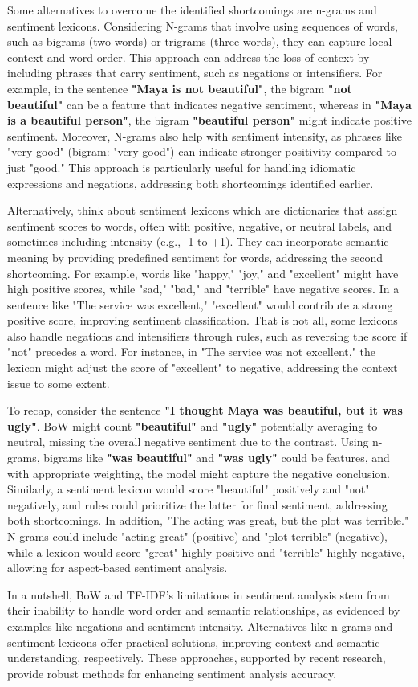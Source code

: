 Some alternatives to overcome the identified shortcomings are n-grams and sentiment lexicons. Considering N-grams that involve using sequences of words, such as bigrams (two words) or trigrams (three words), they can capture local context and word order. This approach can address the loss of context by including phrases that carry sentiment, such as negations or intensifiers. For example, in the sentence \textbf{"Maya is not beautiful"}, the bigram \textbf{"not beautiful"} can be a feature that indicates negative sentiment, whereas in \textbf{"Maya is a beautiful person"}, the bigram \textbf{"beautiful person"} might indicate positive sentiment. Moreover, N-grams also help with sentiment intensity, as phrases like "very good" (bigram: "very good") can indicate stronger positivity compared to just "good." This approach is particularly useful for handling idiomatic expressions and negations, addressing both shortcomings identified earlier.

Alternatively, think about sentiment lexicons which are dictionaries that assign sentiment scores to words, often with positive, negative, or neutral labels, and sometimes including intensity (e.g., -1 to +1). They can incorporate semantic meaning by providing predefined sentiment for words, addressing the second shortcoming. For example, words like "happy," "joy," and "excellent" might have high positive scores, while "sad," "bad," and "terrible" have negative scores. In a sentence like "The service was excellent," "excellent" would contribute a strong positive score, improving sentiment classification. That is not all, some lexicons also handle negations and intensifiers through rules, such as reversing the score if "not" precedes a word. For instance, in "The service was not excellent," the lexicon might adjust the score of "excellent" to negative, addressing the context issue to some extent. 

To recap, consider the sentence \textbf{"I thought Maya was beautiful, but it was ugly"}. BoW might count \textbf{"beautiful"} and \textbf{"ugly"} potentially averaging to neutral, missing the overall negative sentiment due to the contrast. Using n-grams, bigrams like \textbf{"was beautiful"} and \textbf{"was ugly"} could be features, and with appropriate weighting, the model might capture the negative conclusion. Similarly, a sentiment lexicon would score "beautiful" positively and "not" negatively, and rules could prioritize the latter for final sentiment, addressing both shortcomings. In addition, "The acting was great, but the plot was terrible." N-grams could include "acting great" (positive) and "plot terrible" (negative), while a lexicon would score "great" highly positive and "terrible" highly negative, allowing for aspect-based sentiment analysis.

In a nutshell, BoW and TF-IDF's limitations in sentiment analysis stem from their inability to handle word order and semantic relationships, as evidenced by examples like negations and sentiment intensity. Alternatives like n-grams and sentiment lexicons offer practical solutions, improving context and semantic understanding, respectively. These approaches, supported by recent research, provide robust methods for enhancing sentiment analysis accuracy.
